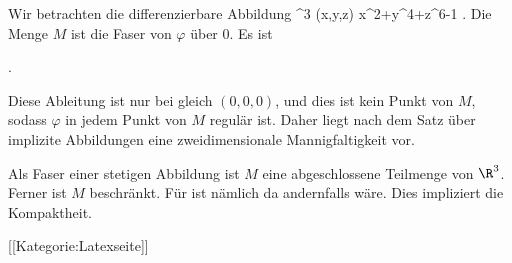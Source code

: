 Wir betrachten die differenzierbare Abbildung
\maabbeledisp {\varphi} {\R^3} {\R
} {(x,y,z)} { x^2+y^4+z^6-1
} {.}
Die Menge $M$ ist die Faser von $\varphi$ über $0$. Es ist

 { . }

Diese Ableitung ist nur bei
 gleich $(0,0,0)$, und dies ist kein Punkt von $M$, sodass $\varphi$ in jedem Punkt von $M$ regulär ist. Daher liegt nach dem Satz über implizite Abbildungen eine zweidimensionale Mannigfaltigkeit vor.

Als Faser einer stetigen Abbildung ist $M$ eine abgeschlossene Teilmenge von $\R^3$. Ferner ist $M$ beschränkt. Für
 ist nämlich
 da andernfalls
 wäre. Dies impliziert die Kompaktheit.

 [[Kategorie:Latexseite]]
